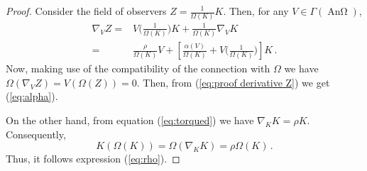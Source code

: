 \documentclass[10pt,a4paper]{amsart}
\DeclareMathOperator{\An}{\text{An}\Omega}
\begin{document}
\begin{proof}
    Consider the field of observers $Z=\frac{1}{\Omega(K)} K$. Then, for any $V\in \Gamma(\An)$,
    \begin{equation}\label{eq:proof derivative Z}
    \begin{split}
        \nabla_V Z ={}& V\big(\tfrac{1}{\Omega(K)}\big) K + \tfrac{1}{\Omega(K)} \nabla_V K \\
        ={}& \tfrac{\rho}{\Omega(K)} V + \left[ \tfrac{\alpha(V)}{\Omega(K)} + V\big(\tfrac{1}{\Omega(K)}\big) \right] K\,.
    \end{split}
    \end{equation}
    Now, making use of the compatibility of the connection with $\Omega$ we have $\Omega(\nabla_V Z) = V(\Omega(Z)) = 0$. Then, from (\ref{eq:proof derivative Z}) we get (\ref{eq:alpha}).

    On the other hand, from equation (\ref{eq:torqued}) we have $\nabla_K K = \rho K$. Consequently,
    \[
        K(\Omega(K)) = \Omega(\nabla_K K) = \rho \Omega(K)\,.
    \]
    Thus, it follows expression (\ref{eq:rho}).
\end{proof}
\end{document}
